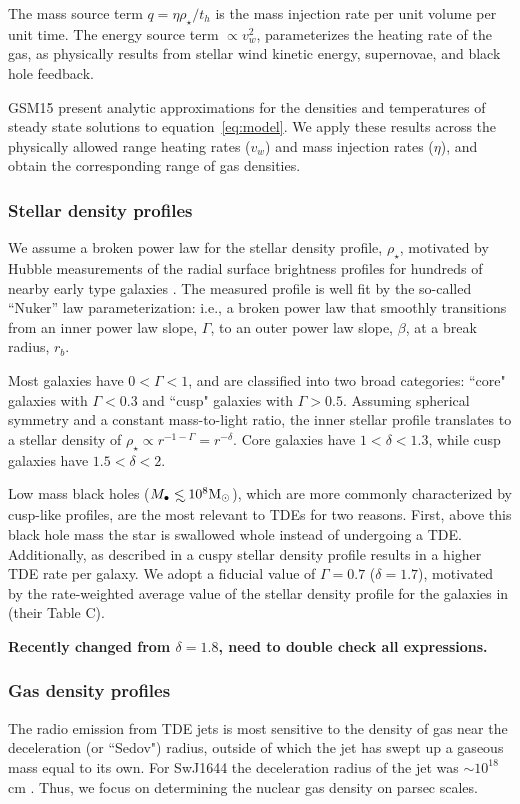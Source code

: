 \documentclass[usenatbib,fleqn]{mnras}
\newcommand\lsim{\mathrel{\rlap{\lower4pt\hbox{\hskip1pt$\sim$}}
    \raise1pt\hbox{$<$}}}
\newcommand{\Mbh}[1][]{M_{\bullet#1}}
\renewcommand{\th}{t_h}
\newcommand{\Msun}{{\rm M_\odot}}
\begin{document}
The mass source term $q =\eta \rho_\star/\th$ is the mass injection
rate per unit volume per unit time. The energy source term $\propto v_w^{2}$, parameterizes the
heating rate of the gas, as physically results from stellar wind
kinetic energy, supernovae, and black hole feedback.

GSM15 present analytic approximations for the
densities and temperatures of steady state solutions to
equation~\eqref{eq:model}. We apply these results across the
physically allowed range heating rates ($v_w$) and mass injection
rates ($\eta$), and obtain the corresponding range of gas densities.

\subsubsection{Stellar density profiles}
We assume a broken power law for the stellar density profile, $\rho_{\star}$,  motivated by Hubble measurements of the radial surface brightness profiles for hundreds of nearby early type galaxies \citep{Lauer+2007}.  The measured profile is well fit by the so-called ``Nuker'' law parameterization:
i.e., a broken power law that smoothly transitions from an inner power law
slope, $\Gamma$, to an outer power law slope, $\beta$, at a break
radius, $r_b$.

Most galaxies have $0<\Gamma<1$, and are classified into two broad
categories: ``core" galaxies with $\Gamma<0.3$ and ``cusp" galaxies with
$\Gamma>0.5$. Assuming spherical symmetry and a constant mass-to-light
ratio, the inner stellar profile translates to a stellar density of
$\rho_\star\propto r^{-1-\Gamma}=r^{-\delta}$. Core galaxies have
$1<\delta<1.3$, while cusp galaxies have $1.5<\delta<2$.

Low mass black holes ($\Mbh\lsim 10^{8} \Msun$), which are more commonly characterized by cusp-like profiles, are the most relevant to TDEs for two reasons.  First, above this black hole mass the star is swallowed whole instead of undergoing a TDE.  Additionally, as described in \citet{Stone&Metzger2016} 
a cuspy stellar density profile results in a higher TDE rate per galaxy.  We adopt a fiducial value of $\Gamma=0.7$ ($\delta=1.7$), motivated by the rate-weighted average value of the stellar density profile for the galaxies in \citet{Stone&Metzger2016} (their Table C).

 {\bf Recently changed from $\delta=1.8$, need to
  double check all expressions.}

\subsubsection{Gas density profiles}
The radio emission from TDE jets is most sensitive to the density of gas near the deceleration (or ``Sedov") radius, outside of which the jet has swept up a gaseous mass equal to its own.  For SwJ1644 the deceleration
radius of the jet was $\sim 10^{18}$ cm \citep{Mimica+2015}. Thus, we focus on determining the nuclear gas density on parsec scales.
\end{document}
